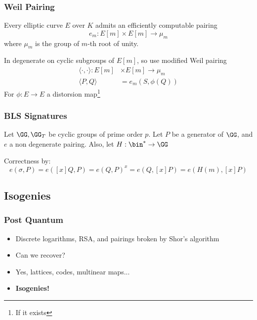 \documentclass{beamer}
\begin{document}
\begin{frame}
    \frametitle{Weil Pairing}
    Every elliptic curve $E$ over $K$ admits an efficiently computable pairing
    \[ e_m : E[m] \times E[m] \to \mu_m \]
    where $\mu_m$ is the group of $m$-th root of unity. 

    In degenerate on cyclic subgroups of $E[m]$, so use modified Weil pairing
    \begin{align*}
        \langle \cdot , \cdot \rangle : E[m] &\times E[m] \to \mu_m \\
        \langle P, Q \rangle &= e_m(S, \phi(Q))
    \end{align*}
    For $\phi: E \to E$ a distorsion map\footnote{If it exists}

\end{frame}

\begin{frame}
    \frametitle{BLS Signatures}
    Let $\GG, \GG_T$ be cyclic groups of prime order $p$. Let $P$ be a generator of $\GG$, and $e$ a non degenerate pairing.
    Also, let $H: \bin^* \to \GG$
    \begin{center}
        
    \begin{pcvstack}
        \begin{pchstack}

        \end{pchstack}


    \end{pcvstack}
    \end{center}
    Correctness by:
    \[ e(\sigma, P) = e([x]Q, P) = e(Q, P)^x = e(Q, [x]P) = e(H(m), [x]P) \]
 
\end{frame}

\subsection{Isogenies}
\begin{frame}
    \frametitle{Post Quantum}
    \begin{itemize}
        \item<1-> Discrete logarithms, RSA, and pairings broken by Shor's algorithm
        \item<2-> Can we recover?
        \item<3-> Yes, lattices, codes, multinear maps...
        \item<4-> \textbf{Isogenies!}
    \end{itemize}
\end{frame}
\end{document}
